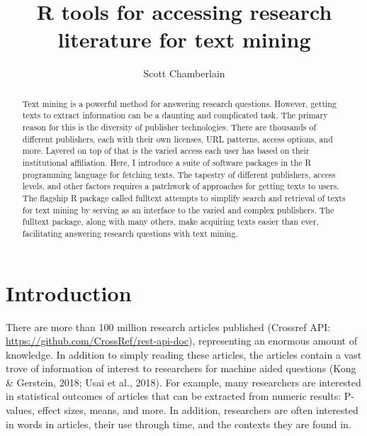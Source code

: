 \documentclass[author-year, review, 11pt]{components/elsarticle} %
\begin{document}
\begin{frontmatter}

  \title{R tools for accessing research literature for text mining}
    \author[cstar]{Scott Chamberlain}
      \address[cstar]{rOpenSci, Museum of Paleontology, University of California, Berkeley,
CA, USA}
  
  \begin{abstract}
  Text mining is a powerful method for answering research questions.
  However, getting texts to extract information can be a daunting and
  complicated task. The primary reason for this is the diversity of
  publisher technologies. There are thousands of different publishers,
  each with their own licenses, URL patterns, access options, and more.
  Layered on top of that is the varied access each user has based on their
  institutional affiliation. Here, I introduce a suite of software
  packages in the R programming language for fetching texts. The tapestry
  of different publishers, access levels, and other factors requires a
  patchwork of approaches for getting texts to users. The flagship R
  package called fulltext attempts to simplify search and retrieval of
  texts for text mining by serving as an interface to the varied and
  complex publishers. The fulltext package, along with many others, make
  acquiring texts easier than ever, facilitating answering research
  questions with text mining.
  \end{abstract}
  
 \end{frontmatter}


\newpage

\hypertarget{introduction}{%
\section{Introduction}\label{introduction}}

There are more than 100 million research articles published (Crossref
API: \url{https://github.com/CrossRef/rest-api-doc}), representing an
enormous amount of knowledge. In addition to simply reading these
articles, the articles contain a vast trove of information of interest
to researchers for machine aided questions (Kong \& Gerstein, 2018; Usai
et al., 2018). For example, many researchers are interested in
statistical outcomes of articles that can be extracted from numeric
results: P-values, effect sizes, means, and more. In addition,
researchers are often interested in words in articles, their use through
time, and the contexts they are found in.
\end{document}
